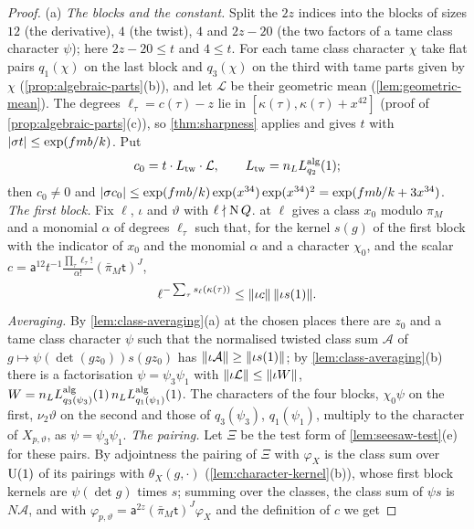 \begin{proof}
(a) \emph{The blocks and the constant.} Split the $2z$ indices into the blocks of sizes $12$ (the derivative), $4$ (the twist), $4$ and $2z-20$ (the two factors of a tame class character $\psi$); here $2z-20\le t$ and $4\le t$. For each
tame class character $\chi$ take flat pairs $q_1(\chi)$ on the last block and $q_3(\chi)$ on the third with tame parts given by $\chi$ (\cref{prop:algebraic-parts}(b)), and let $\mathcal L$ be their geometric mean (\cref{lem:geometric-mean}). The
degrees $\ell_\tau=c(\tau)-z$ lie in $[\kappa(\tau),\kappa(\tau)+x^{42}]$ (proof of \cref{prop:algebraic-parts}(c)), so \cref{thm:sharpness} applies and gives $t$ with $\lvert \sigma t\rvert\le\exp(fmb/k)$. Put
\[
  c_0=t\cdot L_{\rm tw}\cdot\mathcal L,\qquad L_{\rm tw}=n_LL^{\rm alg}_{q_2}(1);
\]
then $c_0\ne0$ and $\lvert \sigma c_0\rvert\le\exp(fmb/k)\exp(x^{34})\exp(x^{34})^2=\exp(fmb/k+3x^{34})$.
\emph{The first block.} Fix $\ell$, $\iota$ and $\vartheta$ with $\ell\nmid\operatorname{N} Q$.  at $\ell$ gives a class $x_0$ modulo $\pi_M$ and a monomial $\alpha$ of degrees $\ell_\tau$ such that, for the kernel $s(g)$ of the first block with the
indicator of $x_0$ and the monomial $\alpha$ and a character $\chi_0$, and the scalar $c=\mathsf a^{12}t^{-1}\frac{\prod_\tau\ell_\tau!}{\alpha!}(\bar\pi_M\mathsf t)^J$,
\[
  \ell^{-\sum_\tau s_\ell(\kappa(\tau))}\le\lVert \iota c\rVert\,\lVert \iota s(1)\rVert.
\]
\emph{Averaging.} By \cref{lem:class-averaging}(a) at the chosen places there are $z_0$ and a tame class character $\psi$ such that the normalised twisted class sum $\mathcal A$ of $g\mapsto\psi(\det(gz_0))s(gz_0)$ has $\lVert \iota\mathcal A\rVert\ge\lVert \iota s(1)\rVert$; by
\cref{lem:class-averaging}(b) there is a factorisation $\psi=\psi_3\psi_1$ with $\lVert \iota\mathcal L\rVert\le\lVert \iota W\rVert$, $W=n_LL^{\rm alg}_{q_3(\psi_3)}(1)\,n_LL^{\rm alg}_{q_1(\psi_1)}(1)$. The characters of the four blocks, $\chi_0\psi$ on the first, $\nu_2\vartheta$ on the second and
those of $q_3(\psi_3)$, $q_1(\psi_1)$, multiply to the character of $X_{p,\vartheta}$, as $\psi=\psi_3\psi_1$.
\emph{The pairing.} Let $\Xi$ be the test form of \cref{lem:seesaw-test}(e) for these pairs. By adjointness the pairing of $\Xi$ with $\varphi_{X}$ is the class sum over $\operatorname{U}(1)$ of its pairings with $\theta_X(g,\cdot)$
(\cref{lem:character-kernel}(b)), whose first block kernels are $\psi(\det g)$ times $s$; summing over the classes, the class sum of $\psi s$ is $N\mathcal A$, and with $\varphi_{p,\vartheta}=\mathsf a^{2z}(\bar\pi_M\mathsf t)^J\varphi_X$ and the definition of $c$ we get

\end{proof}
